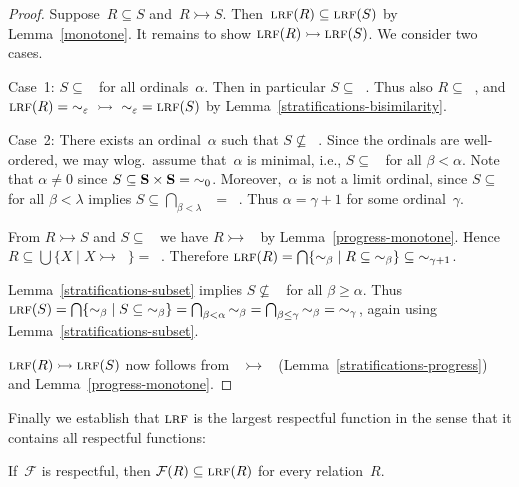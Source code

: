 \documentclass{CSML}
\theoremstyle{definition}
\newcommand{\progress}{\rightarrowtail}
\newcommand{\F}{\mathcal{F}}
\newcommand{\LRF}{\mbox{\sc{lrf}}}  \newcommand{\R}{\mathrel{R}}
\begin{document}
\begin{proof}
Suppose~$R \subseteq S$ and~$R \progress S$.  Then~$\LRF(R) \subseteq
\LRF(S)$ by Lemma~\ref{monotone}.  It remains to show $\LRF(R)
\progress \LRF(S)$.  We consider two cases.

Case~1: $S \subseteq \mathop{\sim_\alpha}$ for all ordinals~$\alpha$.
Then in particular $S \subseteq \mathop{\sim_\varepsilon}$.  Thus also
$R \subseteq \mathop{\sim_\varepsilon}$, and $\LRF(R) =
\mathop{\sim_\varepsilon}\ \progress\ \mathop{\sim_\varepsilon} =
\LRF(S)$ by Lemma~\ref{stratifications-bisimilarity}.

Case~2: There exists an ordinal~$\alpha$ such that $S \not\subseteq
\mathop{\sim_\alpha}$.  Since the ordinals are well-ordered, we may
wlog.\ assume that~$\alpha$ is minimal, i.e., $S \subseteq
\mathop{\sim_\beta}$ for all $\beta < \alpha$.  Note that $\alpha \neq
0$ since $S \subseteq {\bf S} \times {\bf S} = \mathop{\sim_0}$.
Moreover,~$\alpha$ is not a limit ordinal, since $S \subseteq
\mathop{\sim_\beta}$ for all $\beta < \lambda$ implies $S \subseteq
\bigcap_{\beta < \lambda} \mathop{\sim_\beta} =
\mathop{\sim_\lambda}$.  Thus $\alpha = \gamma + 1$ for some
ordinal~$\gamma$.

From $R \progress S$ and $S \subseteq \mathop{\sim_\gamma}$ we have $R
\progress \mathop{\sim_\gamma}$ by Lemma~\ref{progress-monotone}.
Hence $R \subseteq \bigcup \{X \mid X \progress \mathop{\sim_\gamma}\}
= \mathop{\sim_{\gamma+1}}$.  Therefore $\LRF(R) = \bigcap
\{\mathop{\sim_\beta} \mid R \subseteq \mathop{\sim_\beta}\} \subseteq
\mathop{\sim_{\gamma+1}}$.

Lemma~\ref{stratifications-subset} implies $S \not\subseteq
\mathop{\sim_\beta}$ for all $\beta \geq \alpha$.  Thus $\LRF(S) =
\bigcap \{\mathop{\sim_\beta} \mid S \subseteq \mathop{\sim_\beta}\} =
\bigcap_{\beta<\alpha} \mathop{\sim_\beta} = \bigcap_{\beta \leq
  \gamma} \mathop{\sim_\beta} = \mathop{\sim_\gamma}$, again using
Lemma~\ref{stratifications-subset}.

$\LRF(R) \progress \LRF(S)$ now follows from $\mathop{\sim_{\gamma+1}}
\progress \mathop{\sim_\gamma}$ (Lemma~\ref{stratifications-progress})
and Lemma~\ref{progress-monotone}.
\end{proof}

Finally we establish that $\LRF$ is the largest respectful function in
the sense that it contains all respectful functions:

\begin{thm}
\label{lrf-is-largest}
If~$\F$ is respectful, then $\F(R) \subseteq \LRF(R)$ for every
relation~$R$.
\end{thm}
\end{document}
